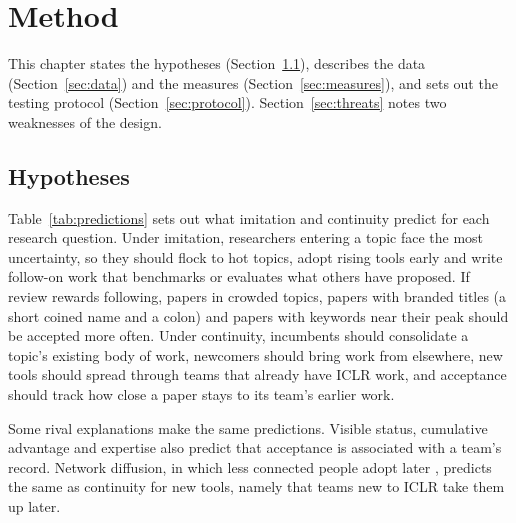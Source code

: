 \chapter{Method}
\label{sec:design}

This chapter states the hypotheses (Section~\ref{sec:hypotheses}), describes the data (Section~\ref{sec:data}) and the
measures (Section~\ref{sec:measures}), and sets out the testing protocol (Section~\ref{sec:protocol}).
Section~\ref{sec:threats} notes two weaknesses of the design.

\section{Hypotheses}
\label{sec:hypotheses}

Table~\ref{tab:predictions} sets out what imitation and continuity predict for each research question.
Under imitation, researchers entering a topic face the most uncertainty, so they should flock to hot topics, adopt
rising tools early and write follow-on work that benchmarks or evaluates what others have proposed. If review rewards
following, papers in crowded topics, papers with branded titles (a short coined name and a colon) and papers with
keywords near their peak should be accepted more often. Under continuity, incumbents should consolidate a topic's
existing body of work, newcomers should bring work from elsewhere, new tools should spread through teams that already
have ICLR work, and acceptance should track how close a paper stays to its team's earlier work.

Some rival explanations make the same predictions. Visible status, cumulative advantage and expertise
\citep{merton1968matthew,ibrahim2026bias,li2017expertise} also predict that acceptance is associated with a team's
record. Network diffusion, in which less connected people adopt later \citep{coleman1957diffusion}, predicts the same as
continuity for new tools, namely that teams new to ICLR take them up later.


